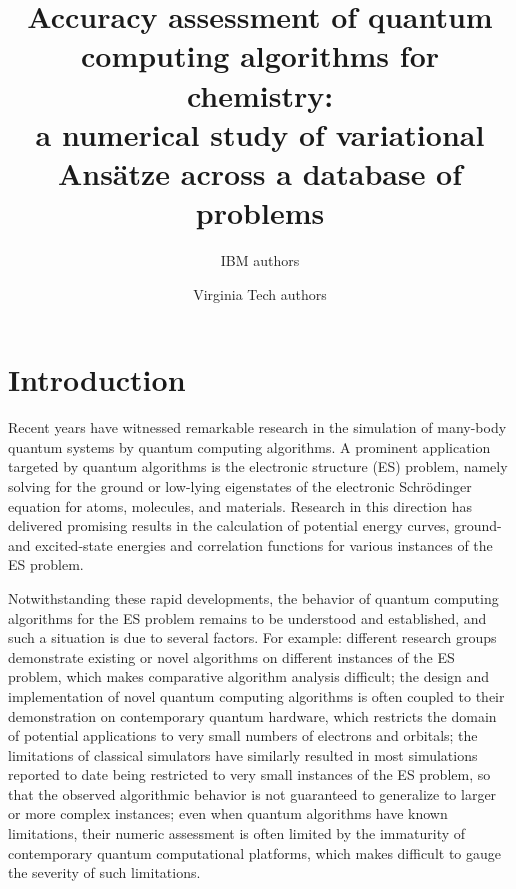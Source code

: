 \documentclass[aps,pra,twocolumn]{revtex4-2}
\begin{document}
\title{Accuracy assessment of quantum computing algorithms for chemistry: \\
a numerical study of variational Ans\"{a}tze across a database of problems}

\author{IBM authors}
\author{Virginia Tech authors}

\begin{abstract}
\end{abstract}

\maketitle

\section{Introduction}

Recent years have witnessed remarkable research in the simulation of many-body quantum systems  by quantum computing algorithms.
A prominent application targeted by quantum algorithms is the electronic structure (ES) problem, 
namely solving for the ground or low-lying eigenstates of the electronic Schr\"{o}dinger equation for atoms, molecules, and materials.
Research in this direction has delivered promising results in the calculation of potential energy curves, 
ground- and excited-state energies and correlation functions for various instances of the ES problem.

Notwithstanding these rapid developments, the behavior of quantum computing algorithms for the ES problem remains to be understood and established,
and such a situation is due to several factors. For example: 
different research groups demonstrate existing or novel algorithms on different instances of the ES problem, which makes comparative algorithm analysis difficult;
the design and implementation of novel quantum computing algorithms is often coupled to their demonstration on contemporary quantum hardware, which restricts the domain of potential applications to very small numbers of electrons and orbitals;
the limitations of classical simulators have similarly resulted in most simulations reported to date being restricted to very small instances of the ES problem, so that the observed algorithmic behavior is not guaranteed to generalize to larger or more complex instances;
even when quantum algorithms have known limitations, their numeric assessment is often limited by the immaturity of contemporary quantum computational platforms, which makes difficult to gauge the severity of such limitations.
\end{document}
